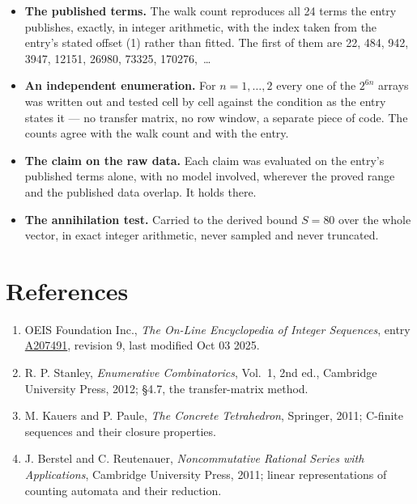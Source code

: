 \documentclass[11pt]{article}
\theoremstyle{definition}
\begin{document}
\begin{itemize}

\item {\bfseries The published terms.} The walk count reproduces all 24 terms the entry publishes, exactly, in integer arithmetic, with the index taken from the entry's stated offset (1) rather than fitted. The first of them are 22, 484, 942, 3947, 12151, 26980, 73325, 170276,~\dots

\item {\bfseries An independent enumeration.} For $n = 1,\dots,2$ every one of the $2^{6n}$ arrays was written out and tested cell by cell against the condition as the entry states it --- no transfer matrix, no row window, a separate piece of code. The counts agree with the walk count and with the entry.

\item {\bfseries The claim on the raw data.} Each claim was evaluated on the entry's published terms alone, with no model involved, wherever the proved range and the published data overlap. It holds there.

\item {\bfseries The annihilation test.} Carried to the derived bound $S = 80$ over the whole vector, in exact integer arithmetic, never sampled and never truncated.

\end{itemize}

\section{References}

\begin{enumerate}

\item OEIS Foundation Inc., \emph{The On-Line Encyclopedia of Integer Sequences}, entry \href{https://oeis.org/A207491}{A207491}, revision 9, last modified Oct 03 2025.

\item R. P. Stanley, \emph{Enumerative Combinatorics}, Vol.~1, 2nd ed., Cambridge University Press, 2012; \S4.7, the transfer-matrix method.

\item M. Kauers and P. Paule, \emph{The Concrete Tetrahedron}, Springer, 2011; C-finite sequences and their closure properties.

\item J. Berstel and C. Reutenauer, \emph{Noncommutative Rational Series with Applications}, Cambridge University Press, 2011; linear representations of counting automata and their reduction.

\end{enumerate}
\end{document}

